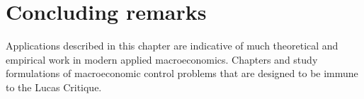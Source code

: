 %
%























\section{Concluding remarks}
Applications described  in this chapter are  indicative  of much theoretical and empirical work
in  modern applied macroeconomics. 
Chapters  and  study formulations of macroeconomic control problems that are designed to be immune to the 
Lucas Critique.
%
%

\newpage



